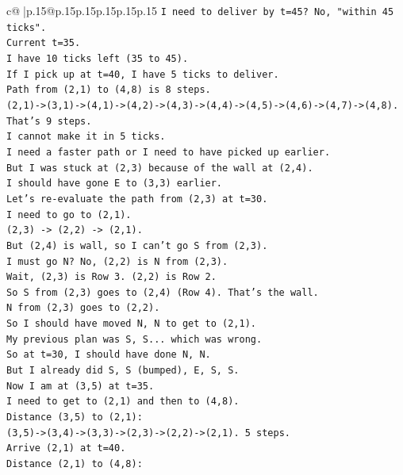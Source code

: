 \documentclass{article}
\begin{document}
{\begin{supertabular}{c@{$\;$}|p{.15\linewidth}@{}p{.15\linewidth}p{.15\linewidth}p{.15\linewidth}p{.15\linewidth}p{.15\linewidth}}
{{{\texttt{I need to deliver by t=45? No, "within 45 ticks".} \\
\texttt{Current t=35.} \\
\texttt{I have 10 ticks left (35 to 45).} \\
\texttt{If I pick up at t=40, I have 5 ticks to deliver.} \\
\texttt{Path from (2,1) to (4,8) is 8 steps.} \\
\texttt{(2,1){-}>(3,1){-}>(4,1){-}>(4,2){-}>(4,3){-}>(4,4){-}>(4,5){-}>(4,6){-}>(4,7){-}>(4,8).} \\
\texttt{That's 9 steps.} \\
\texttt{I cannot make it in 5 ticks.} \\
\texttt{I need a faster path or I need to have picked up earlier.} \\
\texttt{But I was stuck at (2,3) because of the wall at (2,4).} \\
\texttt{I should have gone E to (3,3) earlier.} \\
\texttt{Let's re{-}evaluate the path from (2,3) at t=30.} \\
\texttt{I need to go to (2,1).} \\
\texttt{(2,3) {-}> (2,2) {-}> (2,1).} \\
\texttt{But (2,4) is wall, so I can't go S from (2,3).} \\
\texttt{I must go N? No, (2,2) is N from (2,3).} \\
\texttt{Wait, (2,3) is Row 3. (2,2) is Row 2.} \\
\texttt{So S from (2,3) goes to (2,4) (Row 4). That's the wall.} \\
\texttt{N from (2,3) goes to (2,2).} \\
\texttt{So I should have moved N, N to get to (2,1).} \\
\texttt{My previous plan was S, S... which was wrong.} \\
\texttt{So at t=30, I should have done N, N.} \\
\texttt{But I already did S, S (bumped), E, S, S.} \\
\texttt{Now I am at (3,5) at t=35.} \\
\texttt{I need to get to (2,1) and then to (4,8).} \\
\texttt{Distance (3,5) to (2,1):} \\
\texttt{(3,5){-}>(3,4){-}>(3,3){-}>(2,3){-}>(2,2){-}>(2,1). 5 steps.} \\
\texttt{Arrive (2,1) at t=40.} \\
\texttt{Distance (2,1) to (4,8):} \\
}}}
\end{supertabular}}
\end{document}
